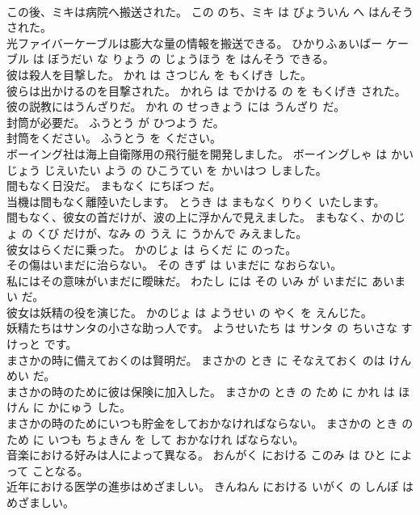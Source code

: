 \documentclass[8pt]{extreport}
\begin{document}
\begin{CJK}{UTF8}{min}
\\	この後、ミキは病院へ搬送された。	この のち、ミキ は びょういん へ はんそう された。	
\\	光ファイバーケーブルは膨大な量の情報を搬送できる。	ひかりふぁいばー ケーブル は ぼうだい な りょう の じょうほう を はんそう できる。	
\\	彼は殺人を目撃した。	かれ は さつじん を もくげき した。	
\\	彼らは出かけるのを目撃された。	かれら は でかける の を もくげき された。	
\\	彼の説教にはうんざりだ。	かれ の せっきょう には うんざり だ。	
\\	封筒が必要だ。	ふうとう が ひつよう だ。	
\\	封筒をください。	ふうとう を ください。	
\\	ボーイング社は海上自衛隊用の飛行艇を開発しました。	ボーイングしゃ は かいじょう じえいたい よう の ひこうてい を かいはつ しました。	
\\	間もなく日没だ。	まもなく にちぼつ だ。	
\\	当機は間もなく離陸いたします。	とうき は まもなく りりく いたします。	
\\	間もなく、彼女の首だけが、波の上に浮かんで見えました。	まもなく、かのじょ の くび だけが、なみ の うえ に うかんで みえました。	
\\	彼女はらくだに乗った。	かのじょ は らくだ に のった。	
\\	その傷はいまだに治らない。	その きず は いまだに なおらない。	
\\	私にはその意味がいまだに曖昧だ。	わたし には その いみ が いまだに あいまい だ。	
\\	彼女は妖精の役を演じた。	かのじょ は ようせい の やく を えんじた。	
\\	妖精たちはサンタの小さな助っ人です。	ようせいたち は サンタ の ちいさな すけっと です。	
\\	まさかの時に備えておくのは賢明だ。	まさかの とき に そなえておく のは けんめい だ。	
\\	まさかの時のために彼は保険に加入した。	まさかの とき の ため に かれ は ほけん に かにゅう した。	
\\	まさかの時のためにいつも貯金をしておかなければならない。	まさかの とき の ため に いつも ちょきん を して おかなけれ ばならない。	
\\	音楽における好みは人によって異なる。	おんがく における このみ は ひと によって ことなる。	
\\	近年における医学の進歩はめざましい。	きんねん における いがく の しんぽ は めざましい。	

\end{CJK}
\end{document}
